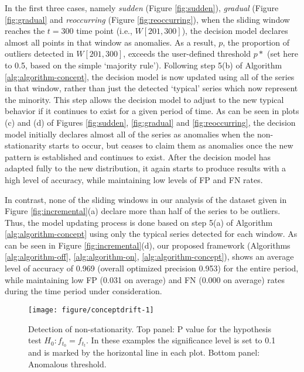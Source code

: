 \documentclass[12pt]{article}
\begin{document}
In the first three cases, namely \emph{sudden} (Figure
\ref{fig:sudden}), \emph{gradual} (Figure \ref{fig:gradual} and
\emph{reoccurring} (Figure \ref{fig:reoccurring}), when the sliding
window reaches the \(t=300\) time point (i.e., \(W[201, 300]\)), the
decision model declares almost all points in that window as anomalies.
As a result, \(p\), the proportion of outliers detected in
\(W[201, 300]\), exceeds the user-defined threshold \(p*\) (set here to
0.5, based on the simple `majority rule'). Following step 5(b) of
Algorithm \ref{alg:algorithm-concept}, the decision model is now updated
using all of the series in that window, rather than just the detected
`typical' series which now represent the minority. This step allows the
decision model to adjust to the new typical behavior if it continues to
exist for a given period of time. As can be seen in plots (c) and (d) of
Figures \ref{fig:sudden}, \ref{fig:gradual} and \ref{fig:reoccurring},
the decision model initially declares almost all of the series as
anomalies when the non-stationarity starts to occur, but ceases to claim
them as anomalies once the new pattern is established and continues to
exist. After the decision model has adapted fully to the new
distribution, it again starts to produce results with a high level of
accuracy, while maintaining low levels of FP and FN rates.

In contrast, none of the sliding windows in our analysis of the dataset
given in Figure \ref{fig:incremental}(a) declare more than half of the
series to be outliers. Thus, the model updating process is done based on
step 5(a) of Algorithm \ref{alg:algorithm-concept} using only the
typical series detected for each window. As can be seen in Figure
\ref{fig:incremental}(d), our proposed framework (Algorithms
\ref{alg:algorithm-off}, \ref{alg:algorithm-on},
\ref{alg:algorithm-concept}), shows an average level of accuracy of
0.969 (overall optimized precision 0.953) for the entire period, while
maintaining low FP (0.031 on average) and FN (0.000 on average) rates
during the time period under consideration.

\begin{figure}[!htbp]

{\centering \texttt{[image: figure/conceptdrift-1]} 

}

\caption{Detection of non-stationarity. Top panel: P value for the hypothesis test $H_0: f_{t_{0}} = f_{t_{t}}$. In these examples the significance level is set to 0.1 and is marked by the horizontal line in each plot. Bottom panel: Anomalous threshold.}\label{fig:conceptdrift}
\end{figure}
\end{document}

